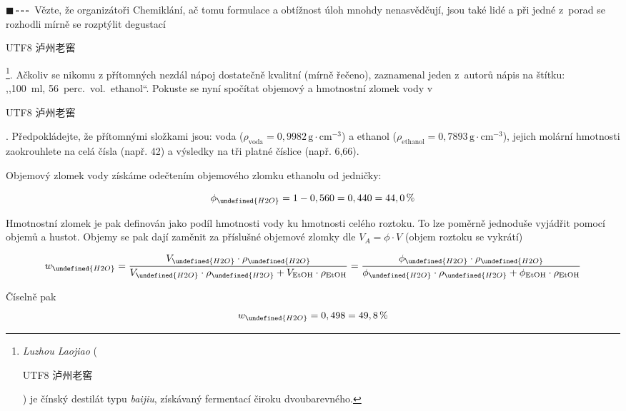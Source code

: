 \documentclass{book}
\let\ch\undefined
\newenvironment{SChinese}{%
\CJKfamily{gbsn}%
\CJKtilde
\CJKnospace}{}
\newcommand{\cntxt}[1]{\begin{CJK}{UTF8}{}\begin{SChinese}#1\end{SChinese}\end{CJK}}
\newcommand{\jeden}{$\blacksquare \, \square \, \square \, \square \; \; $}
\renewenvironment{quotation}{\par}{\par} %
\begin{document}
\hrulefill %
\begin{quotation}
\jeden Vězte, že organizátoři Chemiklání, ač tomu formulace a obtížnost úloh mnohdy
nenasvědčují, jsou také lidé a při jedné z~porad se rozhodli mírně
se rozptýlit degustací \cntxt{泸州老窖}\footnote{\textit{Luzhou Laojiao} (\cntxt{泸州老窖}) je čínský destilát typu \textit{baijiu}, získávaný fermentací čiroku dvoubarevného.}. Ačkoliv se nikomu
z přítomných nezdál nápoj dostatečně kvalitní (mírně řečeno), zaznamenal
jeden z~autorů nápis na štítku:\\,,100~ml, 56~perc.~vol.~ethanol``.
Pokuste se nyní spočítat objemový a hmotnostní zlomek vody v~\cntxt{泸州老窖}.
Předpokládejte, že přítomnými složkami jsou: voda ($\rho_{\mathrm{voda}}=0,9982\,\mathrm{g\cdot cm^{-3}}$)
a ethanol ($\rho_{\mathrm{ethanol}}=0,7893\,\mathrm{g\cdot cm^{-3}}$), jejich molární hmotnosti zaokrouhlete na celá čísla (např. 42) a výsledky
na tři platné číslice (např. 6,66). 
\end{quotation} \dotfill \par 
Objemový zlomek vody získáme odečtením objemového zlomku ethanolu
od jedničky:

\[
\phi_{\ch{H2O}}=1-0,560=0,440=44,0\,\%
\]

Hmotnostní zlomek je pak definován jako podíl hmotnosti vody ku hmotnosti
celého roztoku. To lze poměrně jednoduše vyjádřit pomocí objemů a
hustot. Objemy se pak dají zaměnit za příslušné objemové zlomky dle $V_A = \phi \cdot V$ (objem roztoku se vykrátí)

\[
w_{\ch{H2O}}=\frac{V_{\ch{H2O}}\cdot\rho_{\ch{H2O}}}{V_{\ch{H2O}}\cdot\rho_{\ch{H2O}}+V_{\mathrm{EtOH}}\cdot\rho_{\mathrm{EtOH}}}=\frac{\phi_{\ch{H2O}}\cdot\rho_{\ch{H2O}}}{\phi_{\ch{H2O}}\cdot\rho_{\ch{H2O}}+\phi_{\mathrm{EtOH}}\cdot\rho_{\mathrm{EtOH}}}
\]

Číselně pak
\[
w_{\ch{H2O}}=0,498=49,8\,\%
\]
\end{document}
